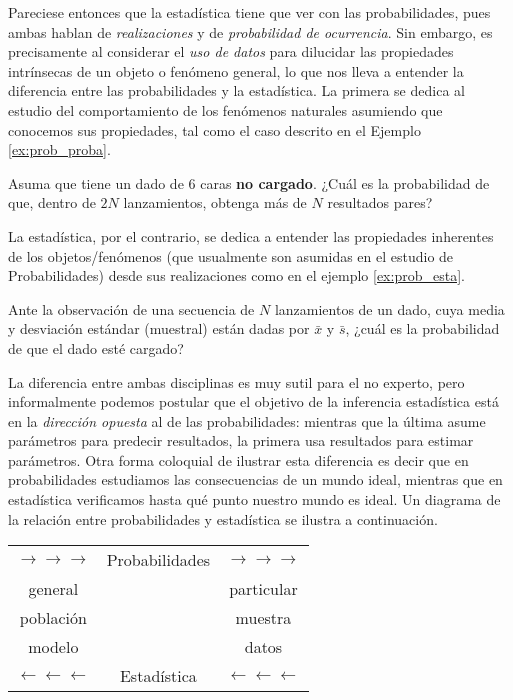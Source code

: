 Pareciese entonces que la estadística tiene que ver con las probabilidades, pues ambas hablan de \emph{realizaciones} y de \emph{probabilidad de ocurrencia}. Sin embargo, es precisamente al considerar el \emph{uso de datos} para dilucidar las propiedades intrínsecas de un objeto o fenómeno general, lo que nos lleva a entender la diferencia entre las probabilidades y la estadística. La primera se dedica al estudio del comportamiento de los fenómenos naturales asumiendo que conocemos sus propiedades, tal como el caso descrito en el Ejemplo \ref{ex:prob_proba}.
\begin{example}
\label{ex:prob_proba}
Asuma que tiene un dado de 6 caras \textbf{no cargado}. ¿Cuál es la probabilidad de que, dentro de $2N$ lanzamientos, obtenga más de $N$ resultados pares?
\end{example}

La estadística, por el contrario, se dedica a entender las propiedades inherentes de los objetos/fenómenos (que usualmente son asumidas en el estudio de Probabilidades) desde sus realizaciones como en el ejemplo \ref{ex:prob_esta}.
\begin{example} 
\label{ex:prob_esta}
Ante la observación de una secuencia de $N$ lanzamientos de un dado, cuya media y desviación estándar (muestral) están dadas por $\bar{x}$ y $\bar{s}$, ¿cuál es la probabilidad de que el dado esté cargado?
\end{example}

La diferencia entre ambas disciplinas es muy sutil para el no experto, pero informalmente podemos postular que el objetivo de la inferencia estadística está en la \emph{dirección opuesta} al de las probabilidades: mientras que la última asume parámetros para predecir resultados, la primera usa resultados para estimar parámetros. Otra forma coloquial de ilustrar esta diferencia es decir que en probabilidades estudiamos las consecuencias de un mundo ideal, mientras que en estadística verificamos hasta qué punto nuestro mundo es ideal. Un diagrama de la relación entre probabilidades y estadística se ilustra a continuación. 

\begin{table}[H]
\begin{tabular}{ccc}
$\rightarrow\rightarrow\rightarrow$ & Probabilidades & $\rightarrow\rightarrow\rightarrow$ \\
general       &                & particular    \\
población     &                & muestra       \\
modelo        &                & datos         \\
$\leftarrow\leftarrow\leftarrow$  & Estadística    & $\leftarrow\leftarrow\leftarrow$ 
\end{tabular}
\end{table}

